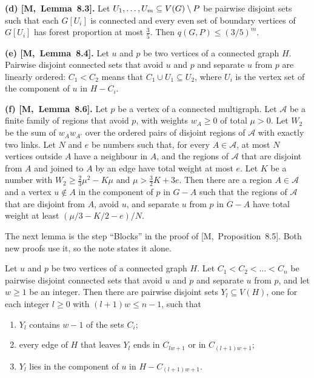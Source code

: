 \documentclass[11pt]{article}
\newcommand{\M}[1]{[M,~#1]}
\begin{document}
\begin{fineprint}
\smallskip
\textbf{(d) \M{Lemma~8.3}.} Let $U_1,\dots,U_m\subseteq V(G)\setminus P$ be pairwise disjoint sets such
that each $G[U_i]$ is connected and every even set of boundary vertices of $G[U_i]$ has forest
proportion at most $\frac35$. Then $q(G,P)\le(3/5)^{m}$.

\smallskip
\textbf{(e) \M{Lemma~8.4}.} Let $u$ and $p$ be two vertices of a connected graph $H$. Pairwise
disjoint connected sets that avoid $u$ and $p$ and separate $u$ from $p$ are linearly ordered:
$C_1<C_2$ means that $C_1\cup U_1\subseteq U_2$, where $U_i$ is the vertex set of the component of
$u$ in $H-C_i$.

\smallskip
\textbf{(f) \M{Lemma~8.6}.} Let $p$ be a vertex of a connected multigraph. Let $\mathcal A$ be a
finite family of regions that avoid $p$, with weights $w_A\ge0$ of total $\mu>0$. Let $W_2$ be the
sum of $w_Aw_{A'}$ over the ordered pairs of disjoint regions of $\mathcal A$ with exactly two
links. Let $N$ and $e$ be numbers such that, for every $A\in\mathcal A$, at most $N$ vertices
outside $A$ have a neighbour in $A$, and the regions of $\mathcal A$ that are disjoint from $A$
and joined to $A$ by an edge have total weight at most $e$. Let $K$ be a number with
$W_2\ge\frac23\mu^{2}-K\mu$ and $\mu>\frac32K+3e$. Then there are a region $A\in\mathcal A$ and a
vertex $u\notin A$ in the component of $p$ in $G-A$ such that the regions of $\mathcal A$ that
are disjoint from $A$, avoid $u$, and separate $u$ from $p$ in $G-A$ have total weight at least
$(\mu/3-K/2-e)/N$.
\end{fineprint}

The next lemma is the step ``Blocks'' in the proof of \M{Proposition~8.5}. Both new proofs use
it, so the note states it alone.

\begin{lemma}[Blocks]\label{lem:blocks}
Let $u$ and $p$ be two vertices of a connected graph $H$. Let $C_1<C_2<\dots<C_n$ be pairwise
disjoint connected sets that avoid $u$ and $p$ and separate $u$ from $p$, and let $w\ge1$ be an
integer. Then there are pairwise disjoint sets $Y_l\subseteq V(H)$, one for each integer $l\ge0$
with $(l+1)w\le n-1$, such that
\begin{enumerate}
\item[\textup{(i)}] $Y_l$ contains $w-1$ of the sets $C_i$;
\item[\textup{(ii)}] every edge of $H$ that leaves $Y_l$ ends in $C_{lw+1}$ or in $C_{(l+1)w+1}$;
\item[\textup{(iii)}] $Y_l$ lies in the component of $u$ in $H-C_{(l+1)w+1}$.
\end{enumerate}
\end{lemma}
\end{document}
